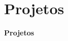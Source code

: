 



\section[Projetos]{Projetos}\label{sec:projetos}



{
  \begin{frame}[plain]%

    \vfill

    \centering{}
    \Huge{\textbf{Projetos}}

    \vfill

  \end{frame}
} %



